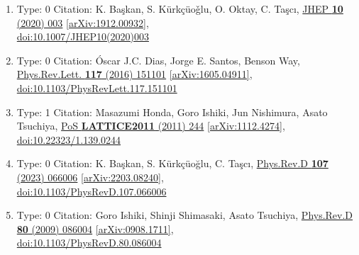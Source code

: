 \documentclass[a4paper,10pt]{article}
\begin{document}
\begin{enumerate}
\begin{enumerate}
  \item Type: 0 Citation: K. Başkan, S. Kürkçüoǧlu, O. Oktay, C. Taşcı, \href{https://www.doi.org/10.1007/JHEP10(2020)003}{JHEP {\bf 10} (2020) 003}  \href{https://arxiv.org/abs/1912.00932}{[arXiv:1912.00932]},\\\href{https://www.doi.org/10.1007/JHEP10(2020)003}{doi:10.1007/JHEP10(2020)003}
  \item Type: 0 Citation: Óscar J.C. Dias, Jorge E. Santos, Benson Way, \href{https://www.doi.org/10.1103/PhysRevLett.117.151101}{Phys.Rev.Lett. {\bf 117} (2016) 151101}  \href{https://arxiv.org/abs/1605.04911}{[arXiv:1605.04911]},\\\href{https://www.doi.org/10.1103/PhysRevLett.117.151101}{doi:10.1103/PhysRevLett.117.151101}
  \item Type: 1 Citation: Masazumi Honda, Goro Ishiki, Jun Nishimura, Asato Tsuchiya, \href{https://www.doi.org/10.22323/1.139.0244}{PoS {\bf LATTICE2011} (2011) 244}  \href{https://arxiv.org/abs/1112.4274}{[arXiv:1112.4274]},\\\href{https://www.doi.org/10.22323/1.139.0244}{doi:10.22323/1.139.0244}
  \item Type: 0 Citation: K. Başkan, S. Kürkçüoğlu, C. Taşcı, \href{https://www.doi.org/10.1103/PhysRevD.107.066006}{Phys.Rev.D {\bf 107} (2023) 066006}  \href{https://arxiv.org/abs/2203.08240}{[arXiv:2203.08240]},\\\href{https://www.doi.org/10.1103/PhysRevD.107.066006}{doi:10.1103/PhysRevD.107.066006}
  \item Type: 0 Citation: Goro Ishiki, Shinji Shimasaki, Asato Tsuchiya, \href{https://www.doi.org/10.1103/PhysRevD.80.086004}{Phys.Rev.D {\bf 80} (2009) 086004}  \href{https://arxiv.org/abs/0908.1711}{[arXiv:0908.1711]},\\\href{https://www.doi.org/10.1103/PhysRevD.80.086004}{doi:10.1103/PhysRevD.80.086004}

\end{enumerate}
\end{enumerate}
\end{document}
